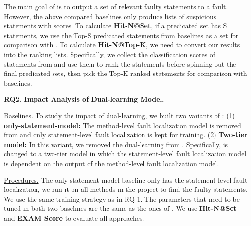 The main goal of {\tool} is to output a set of relevant faulty statements to a fault. However, the above compared baselines only produce lists of suspicious statements with scores. 
To calculate \textbf{Hit-N@Set}, if a predicated set has S statements, we use the Top-S predicated statements from baselines as a set for comparison with {\tool}. To calculate {\bf Hit-N@Top-K}, we need to convert our results into the ranking lists. Specifically, we collect the classification scores of statements from {\tool} and use them to rank the statements before spinning out the final predicated sets, then pick the Top-K ranked statements for comparison with baselines.



{\bf RQ2. Impact Analysis of Dual-learning Model.}

\underline{Baselines.} To study the impact of dual-learning, we built two variants of {\tool}: 
(1) \textbf{only-statement-model:} %
The method-level fault localization model is removed from {\tool} and only statement-level fault localization is kept for training.
(2) \textbf{Two-tier model:} In this variant, we removed the dual-learning from {\tool}. Specifically, {\tool} is changed to a two-tier model in which the statement-level fault localization model is dependent on the output of the method-level fault localization model.

\underline{Procedures.} The only-statement-model baseline only has the statement-level fault localization, we run it on all methods in the project to find the faulty statements. 
We use the same training strategy as in RQ 1. 
The parameters that need to be tuned in both two baselines are the same as the ones of \tool. 
We use \textbf{Hit-N@Set} and \textbf{EXAM Score} to evaluate all approaches.

